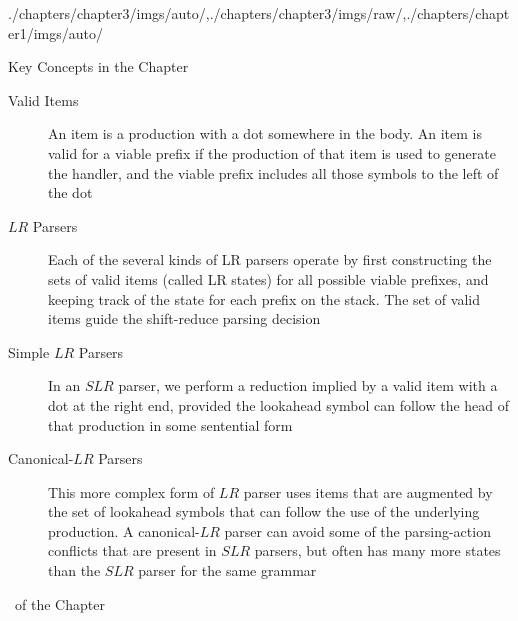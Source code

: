 \begin{graphicspathcontext}{{./chapters/chapter3/imgs/auto/},{./chapters/chapter3/imgs/raw/},{./chapters/chapter1/imgs/auto/}}
\begin{bibunit}[apalike]
\begin{frame}{{Key Concepts} in the Chapter \insertcontinuationtext}
\begin{small}
\begin{description}
	\item[Valid Items] An item is a production with a dot somewhere in the body. An item is valid for a viable prefix if the production of that item is used to generate the handler, and the viable prefix includes all those symbols to the left of the dot
	\item[$LR$ Parsers] Each of the several kinds of LR parsers operate by first constructing the sets of valid items (called LR states) for all possible viable prefixes, and keeping track of the state for each prefix on the stack. The set of valid items guide the shift-reduce parsing decision
	\item[Simple $LR$ Parsers] In an $SLR$ parser, we perform a reduction implied by a valid item with a dot at the right end, provided the lookahead symbol can follow the head of that production in some sentential form
	\item[Canonical-$LR$ Parsers] This more complex form of $LR$ parser uses items that are augmented by the set of lookahead symbols that can follow the use of the underlying production. A canonical-$LR$ parser can avoid some of the parsing-action conflicts that are present in $SLR$ parsers, but often has many more states than the $SLR$ parser for the same grammar
	\end{description}
	\end{small}
\end{frame}

\begin{frame}[t,fancyframetitle=false,allowframebreaks]{\bibname\ of the Chapter}%
	\tiny%
\end{frame}%

\end{bibunit}
\end{graphicspathcontext}
	
\endinput
